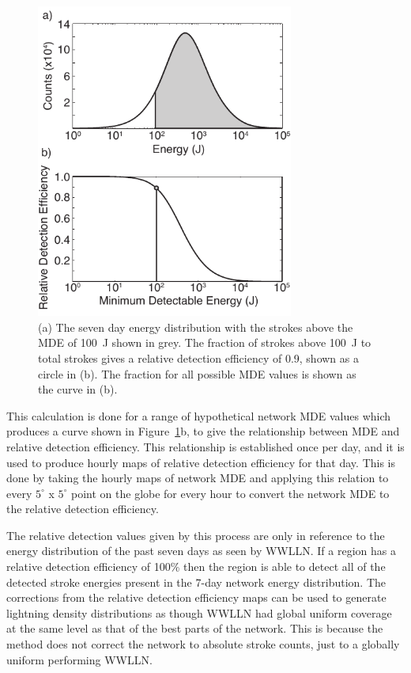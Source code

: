 \begin{figure}[ht!]
   \centering
\noindent\includegraphics[width=20pc]{efficiency/Figures/2012RS005049-f5.pdf} 
   \caption{(a) The seven day energy distribution with the strokes above the MDE of 100~J shown in grey.
The fraction of strokes above 100~J to total strokes gives a relative detection efficiency of 0.9, shown as a circle in (b).
The fraction for all possible MDE values is shown as the curve in (b).}
   \label{efficiency:fig:Curve}
\end{figure}

This calculation is done for a range of hypothetical network MDE values which produces a curve shown in Figure~\ref{efficiency:fig:Curve}b, to give the relationship between MDE and relative detection efficiency.
This relationship is established once per day, and it is used to produce hourly maps of relative detection efficiency for that day.
This is done by taking the hourly maps of network MDE and applying this relation to every $5^\circ$ x $5^\circ$ point on the globe for every hour to convert the network MDE to the relative detection efficiency.

The relative detection values given by this process are only in reference to the energy distribution of the past seven days as seen by WWLLN.
If a region has a relative detection efficiency of 100\% then the region is able to detect all of the detected stroke energies present in the 7-day network energy distribution.
The corrections from the relative detection efficiency maps can be used to generate lightning density distributions as though WWLLN had global uniform coverage at the same level as that of the best parts of the network.
This is because the method does not correct the network to absolute stroke counts, just to a globally uniform performing WWLLN.


